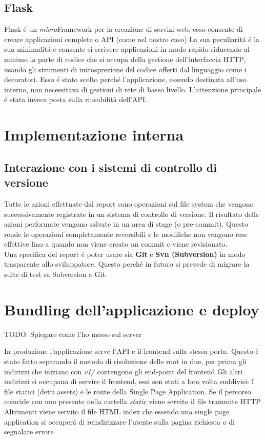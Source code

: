         \subsection{Flask}  
            Flask \'e un \textit{micro}Framework per la creazione di servizi web, esso consente di creare applicazioni complete o API (come nel nostro caso)
            La sua peculiarit\'a \'e la sua minimalit\'a e consente si scrivere applicazioni in modo rapido riducendo al minimo la parte di codice che si occupa della gestione dell'interfaccia HTTP, usando gli strumenti di introsprezione del codice offerti dal linguaggio come i decoratori.
            Esso \'e stato scelto perch\'e l'applicazione, essendo destinata all'uso interno, non necessitava di gestioni di rete di basso livello.
            L'attenzione principale \'e stata invece posta sulla riusabilità dell'API.

    \section{Implementazione interna}
        \subsection{Interazione con i sistemi di controllo di versione}
                
            Tutte le azioni effettuate dal report sono operazioni sul file system che vengono successivamente registrate in un sistema di controllo di versione.
            Il risultato delle azioni performate vengono salvate in un area di stage (o pre-commit).
            Questo rende le operazioni completamente reversibili e le modifiche non vengono rese effettive fino a quando non viene creato un commit e viene revisionato.\\
            Una specifica del report \'e poter usare sia \textbf{Git} e \textbf{Svn (Subversion)} in modo trasparente allo sviluppatore.
            Questo perch\'e in futuro si prevede di migrare la suite di test sa Subversion a Git.
            
    
    \section{Bundling dell'applicazione e deploy}
        TODO: Spiegare come l'ho messo sul server

        In produzione l'applicazione serve l'API e il frontend sulla stessa porta.
        Questo è stato fatto separando il metodo di risoluzione delle root in due, per prima gli indirizzi che iniziano con \textit{v1/} contengono gli end-point del frontend
        Gli altri indirizzi si occupano di servire il frontend, essi son stati a loro volta suddivisi:
        I file statici (detti assets) e le route della Single Page Application.
        Se il percorso coincide con uno presente nella cartella \textit{static} viene servito il file trammite HTTP
        Altrimenti viene servito il file HTML index che essendo una single page application si occuper\'a di reindirizzare l'utente sulla pagina richiesta o di segnalare errore